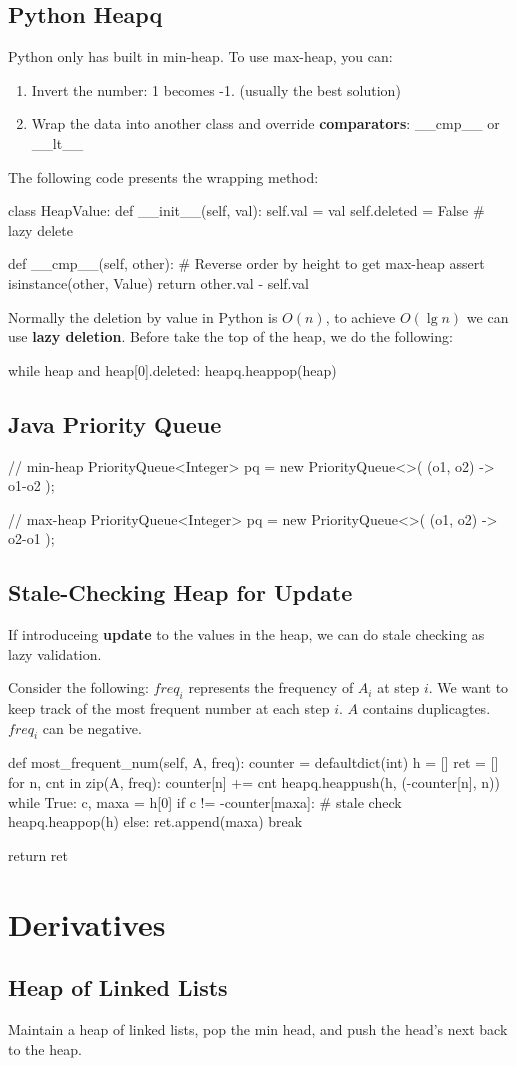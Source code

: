 \subsection{Python Heapq}
Python only has built in min-heap. To use max-heap, you can: 
\begin{enumerate}
\item Invert the number: 1 becomes -1.
(usually the best solution)\item Wrap the data into another class and override \textbf{comparators}: \_\_cmp\_\_ or \_\_lt\_\_
\end{enumerate}

The following code presents the wrapping method:
\begin{python}
class HeapValue:
    def __init__(self, val):
        self.val = val
        self.deleted = False  # lazy delete 

    def __cmp__(self, other):
        # Reverse order by height to get max-heap
        assert isinstance(other, Value)
        return other.val - self.val
\end{python}

Normally the deletion by value in Python is $O(n)$, to achieve $O(\lg n)$ we can use \textbf{lazy deletion}. Before take the top of the heap, we do the following:
\begin{python}
while heap and heap[0].deleted:
    heapq.heappop(heap)
\end{python}
\subsection{Java Priority Queue}
\begin{java}
// min-heap
PriorityQueue<Integer> pq = new PriorityQueue<>(
    (o1, o2) -> o1-o2
);

// max-heap
PriorityQueue<Integer> pq = new PriorityQueue<>(
    (o1, o2) -> o2-o1
);
\end{java}
\subsection{Stale-Checking Heap for Update}
If introduceing \textbf{update} to the values in the heap, we can do stale checking as lazy validation.

Consider the following: $freq_i$ represents the frequency of $A_i$ at step $i$. We want to keep track of the most frequent number at each step $i$. $A$ contains duplicagtes. $freq_i$ can be negative. 
\begin{python}
def most_frequent_num(self, A, freq):
    counter = defaultdict(int)
    h = []
    ret = []
    for n, cnt in zip(A, freq):
        counter[n] += cnt
        heapq.heappush(h, (-counter[n], n))
        while True:
            c, maxa = h[0]
            if c != -counter[maxa]:  # stale check
                heapq.heappop(h)
            else:
                ret.append(maxa)
                break
    
    return ret
\end{python}

\section{Derivatives}
\subsection{Heap of Linked Lists}
Maintain a heap of linked lists, pop the min head, and push the head's next back to the heap. 

